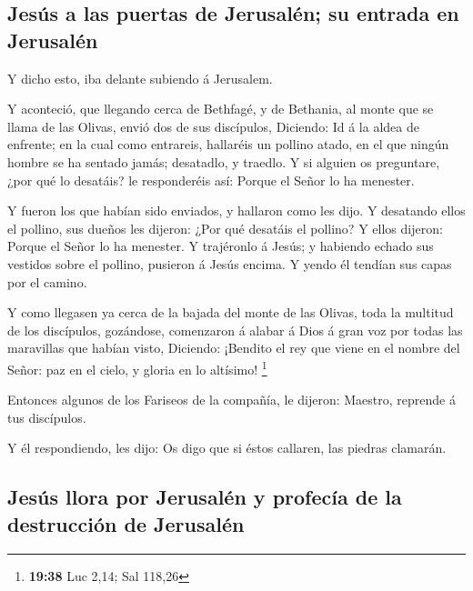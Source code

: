 \hypertarget{jesuxfas-a-las-puertas-de-jerusaluxe9n-su-entrada-en-jerusaluxe9n}{%
\subsection{Jesús a las puertas de Jerusalén; su entrada en
Jerusalén}\label{jesuxfas-a-las-puertas-de-jerusaluxe9n-su-entrada-en-jerusaluxe9n}}

 Y dicho esto, iba delante subiendo á Jerusalem.

 Y aconteció, que llegando cerca de Bethfagé, y de
Bethania, al monte que se llama de las Olivas, envió dos de sus
discípulos,  Diciendo: Id á la aldea de enfrente; en la
cual como entrareis, hallaréis un pollino atado, en el que ningún hombre
se ha sentado jamás; desatadlo, y traedlo.  Y si alguien
os preguntare, ¿por qué lo desatáis? le responderéis así: Porque el
Señor lo ha menester.

 Y fueron los que habían sido enviados, y hallaron como
les dijo.  Y desatando ellos el pollino, sus dueños les
dijeron: ¿Por qué desatáis el pollino?  Y ellos dijeron:
Porque el Señor lo ha menester.  Y trajéronlo á Jesús; y
habiendo echado sus vestidos sobre el pollino, pusieron á Jesús encima.
 Y yendo él tendían sus capas por el camino.

 Y como llegasen ya cerca de la bajada del monte de las
Olivas, toda la multitud de los discípulos, gozándose, comenzaron á
alabar á Dios á gran voz por todas las maravillas que habían visto,
 Diciendo: ¡Bendito el rey que viene en el nombre del
Señor: paz en el cielo, y gloria en lo altísimo! \footnote{\textbf{19:38}
  Luc 2,14; Sal 118,26}

 Entonces algunos de los Fariseos de la compañía, le
dijeron: Maestro, reprende á tus discípulos.

 Y él respondiendo, les dijo: Os digo que si éstos
callaren, las piedras clamarán.

\hypertarget{jesuxfas-llora-por-jerusaluxe9n-y-profecuxeda-de-la-destrucciuxf3n-de-jerusaluxe9n}{%
\subsection{Jesús llora por Jerusalén y profecía de la destrucción de
Jerusalén}\label{jesuxfas-llora-por-jerusaluxe9n-y-profecuxeda-de-la-destrucciuxf3n-de-jerusaluxe9n}}

